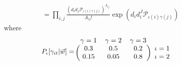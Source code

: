 \documentclass[12pt]{article}
\def\ig{\iota\gamma}
\def\g{\gamma}
\def\i{\iota}
\renewcommand{\P}{\mathbb {P}}
\theoremstyle{definition}
\theoremstyle{plain}
\begin{document}
\begin{figure}[!htbp]
\begin{align*}
	&= \prod_{ i,j } \frac{\left(d_i d_j \mathcal{P}_{\i(i)\g(j)}\right)^{A_{ij}}}{A_{ij}!} \exp \left(d_i d_i^J \mathcal{P}_{\i(i)\g(j)} \right) 
	\end{align*} 
	where
	\[P_{\i}[\g_{it}|\vec{w}] = 
	\begin{blockarray}{lccc}
	\g=1	&\g=2	& \g=3	& 	\\
	\begin{block}{(ccc)r}
	0.3		& 0.5	& 0.2	& \i=1	\\
	0.15	& 0.05	& 0.8	&  \i=2	\\ 
	\end{block}
	\end{blockarray}\]
\end{figure}


\end{document}
